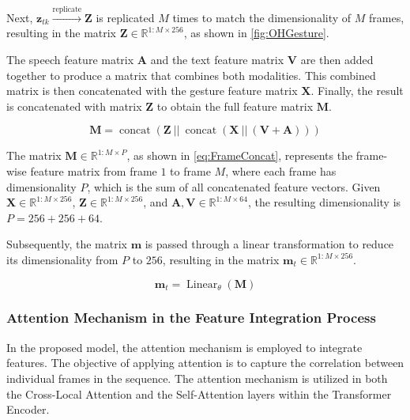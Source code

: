 Next, $\mathbf{z}_{tk} \xrightarrow{\operatorname{replicate}} \mathbf{Z}$ is replicated $M$ times to match the dimensionality of $M$ frames, resulting in the matrix $\mathbf{Z} \in \mathbb{R}^{1:M \times 256}$, as shown in \autoref{fig:OHGesture}.

The speech feature matrix $\mathbf{A}$ and the text feature matrix $\mathbf{V}$ are then added together to produce a matrix that combines both modalities. This combined matrix is then concatenated with the gesture feature matrix $\mathbf{X}$. Finally, the result is concatenated with matrix $\mathbf{Z}$ to obtain the full feature matrix $\mathbf{M}$.


\begin{equation}
	\label{eq:FrameConcat}
	\mathbf{M} = \operatorname{concat}( \mathbf{Z}\  || \   \operatorname{concat}(\mathbf{X}\ || \  (\mathbf{V} + \mathbf{A}) ) )
\end{equation}

The matrix $\mathbf{M} \in \mathbb{R}^{1:M \times P}$, as shown in \autoref{eq:FrameConcat}, represents the frame-wise feature matrix from frame $1$ to frame $M$, where each frame has dimensionality $P$, which is the sum of all concatenated feature vectors. Given $\mathbf{X} \in \mathbb{R}^{1:M \times 256}$, $\mathbf{Z} \in \mathbb{R}^{1:M \times 256}$, and $\mathbf{A}, \mathbf{V} \in \mathbb{R}^{1:M \times 64}$, the resulting dimensionality is $P = 256 + 256 + 64$.

Subsequently, the matrix $\mathbf{m}$ is passed through a linear transformation to reduce its dimensionality from $P$ to $256$, resulting in the matrix $\mathbf{m}_{t} \in \mathbb{R}^{1:M \times 256}$.

\begin{equation}
	\label{eq:FeatureDimensionReducion}
	\mathbf{m}_{t} = \operatorname{Linear}_{\theta}( \mathbf{M} )
\end{equation}

\subsubsection{Attention Mechanism in the Feature Integration Process}

In the proposed model, the attention mechanism \cite{vaswani2017attention} is employed to integrate features. The objective of applying attention is to capture the correlation between individual frames in the sequence. The attention mechanism is utilized in both the Cross-Local Attention and the Self-Attention layers within the Transformer Encoder.

